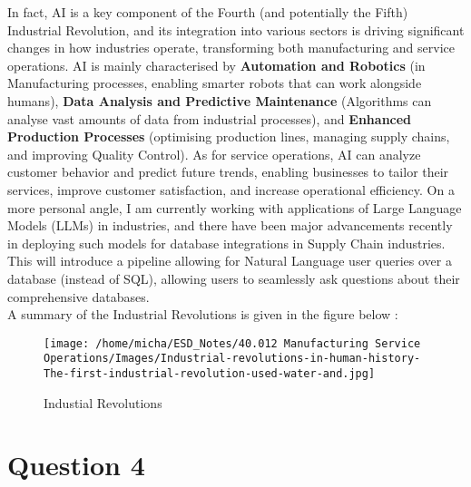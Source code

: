 \documentclass[12pt]{article}
\begin{document}
In fact, AI is a key component of the Fourth (and potentially the Fifth) Industrial Revolution, and its integration into various sectors is driving significant changes in how industries operate, transforming both manufacturing and service operations. AI is mainly characterised by \textbf{Automation and Robotics} (in Manufacturing processes, enabling smarter robots that can work alongside humans), \textbf{Data Analysis and Predictive Maintenance} (Algorithms can analyse vast amounts of data from industrial processes), and \textbf{Enhanced Production Processes} (optimising production lines, managing supply chains, and improving Quality Control). As for service operations, AI can analyze customer behavior and predict future trends, enabling businesses to tailor their services, improve customer satisfaction, and increase operational efficiency. On a more personal angle, I am currently working with applications of Large Language Models (LLMs) in industries, and there have been major advancements recently in deploying such models for database integrations in Supply Chain industries. This will introduce a pipeline allowing for Natural Language user queries over a database (instead of SQL), allowing users to seamlessly ask questions about their comprehensive databases. \\ 

\noindent A summary of the Industrial Revolutions is given in the figure below \cite{article}: 

\begin{figure}[H]
    \centering
    \texttt{[image: /home/micha/ESD\_Notes/40.012 Manufacturing Service Operations/Images/Industrial-revolutions-in-human-history-The-first-industrial-revolution-used-water-and.jpg]}
    \caption{Industial Revolutions}
    \label{fig:3-industrialrevolutions}
\end{figure} 

\newpage

\section*{Question 4}

\end{document}
